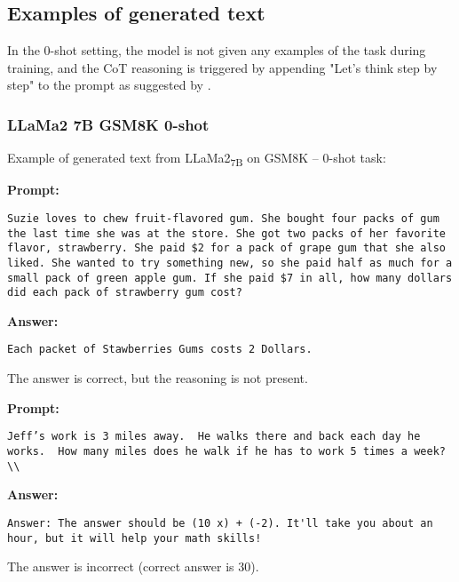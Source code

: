 \subsection{Examples of generated text}
\label{subsec:examples-of-generated-text}

In the 0-shot setting, the model is not given any examples of the task during training, and the CoT reasoning is triggered by appending "Let's think step by step" to the prompt as suggested by \textcite{kojima2023large}.\\

\subsubsection*{LLaMa2 7B GSM8K 0-shot}
\noindent Example of generated text from LLaMa2\textsubscript{7B} on GSM8K -- 0-shot task:
\begin{displayquote}
	\textbf{Prompt:}
	\begin{Verbatim}[fontsize=\small,breaklines]
Suzie loves to chew fruit-flavored gum. She bought four packs of gum the last time she was at the store. She got two packs of her favorite flavor, strawberry. She paid $2 for a pack of grape gum that she also liked. She wanted to try something new, so she paid half as much for a small pack of green apple gum. If she paid $7 in all, how many dollars did each pack of strawberry gum cost?
	\end{Verbatim}
	\textbf{Answer:}
	\begin{Verbatim}[fontsize=\small,breaklines]
Each packet of Stawberries Gums costs 2 Dollars.
	\end{Verbatim}
\end{displayquote}
The answer is correct, but the reasoning is not present.
\begin{displayquote}
	\textbf{Prompt:}
	\begin{Verbatim}[fontsize=\small,breaklines]
Jeff’s work is 3 miles away.  He walks there and back each day he works.  How many miles does he walk if he has to work 5 times a week?\\
	\end{Verbatim}
	\textbf{Answer:}
	\begin{Verbatim}[fontsize=\small,breaklines]
Answer: The answer should be (10 x) + (-2). It'll take you about an hour, but it will help your math skills!
	\end{Verbatim}
\end{displayquote}
The answer is incorrect (correct answer is 30).

